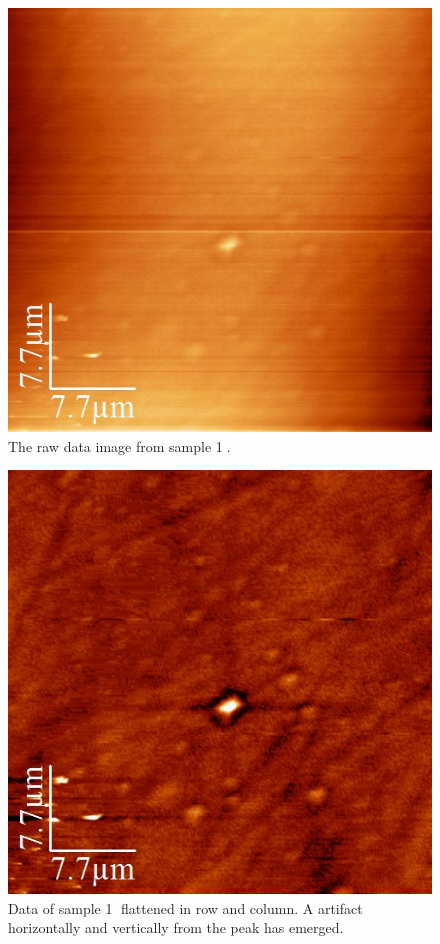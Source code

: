 \documentclass[paper=a4,fontsize=10pt,DIV=18,twocolumn,parskip=half]{scrartcl}
\numberwithin{equation}{section}    %
\begin{document}
\begin{figure}[htp]
    \begin{center}
        \includegraphics[width=0.7\columnwidth]{Bilder/1}
        \caption{The raw data image from sample \textcircled{1}. }
        \label{1}
    \end{center}
\end{figure}

\begin{figure}[htp]
    \begin{center}
        \includegraphics[width=0.7\columnwidth]{Bilder/1f}
        \caption{Data of sample \textcircled{1} flattened in row and column. A 
        artifact horizontally and vertically from the peak has emerged.}
        \label{7f}
    \end{center}
\end{figure}
\end{document}
